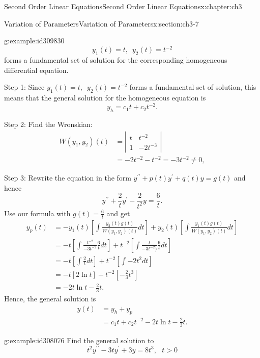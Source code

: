 \documentclass[oneside,10pt,]{book}
\numberwithin{equation}{section}
\numberwithin{equation}{section}
\newcommand{\amp}{&}
\begin{document}
\begin{chapterptx}{Second Order Linear Equations}{}{Second Order Linear Equations}{}{}{x:chapter:ch3}
\begin{sectionptx}{Variation of Parameters}{}{Variation of Parameters}{}{}{x:section:ch3-7}
\begin{example}{}{g:example:id309830}
\begin{equation*}
y_{1}(t)=t,\,\,\,y_{2}(t)=t^{-2}
\end{equation*}
forms a fundamental set of solution for the corresponding homogeneous differential equation.%
\par
Step 1: Since \(y_{1}(t)=t,\,\,\,y_{2}(t)=t^{-2}\) forms a fundamental set of solution, this means that the general solution for the homogeneous equation is%
\begin{equation*}
y_{h}=c_{1}t+c_{2}t^{-2}.
\end{equation*}
%
\par
Step 2: Find the Wronskian:%
\begin{align*}
W(y_{1},y_{2})(t) \amp =\left|\begin{array}{cc}
t \amp t^{-2}\\
1 \amp -2t^{-3}
\end{array}\right|\\
\amp =-2t^{-2}-t^{-2}=-3t^{-2}\neq0,
\end{align*}
%
\par
Step 3: Rewrite the equation in the form \(y^{\prime\prime}+p(t)y^{\prime}+q(t)y=g(t)\) and hence%
\begin{equation*}
y^{\prime\prime}+\frac{2}{t}y^{\prime}-\frac{2}{t^{2}}y=\frac{6}{t}.
\end{equation*}
Use our formula with \(g(t)=\frac{6}{t}\) and get%
\begin{align*}
y_{p}(t) \amp =-y_{1}(t)\left[\int\frac{y_{2}(t)g(t)}{W\left(y_{1},y_{2}\right)(t)}dt\right]+y_{2}(t)\left[\int\frac{y_{1}(t)g(t)}{W\left(y_{1},y_{2}\right)(t)}dt\right]\\
\amp =-t\left[\int\frac{t^{-2}}{-3t^{-2}}\frac{6}{t}dt\right]+t^{-2}\left[\int\frac{t}{-3t^{-2})}\frac{6}{t}dt\right]\\
\amp =-t\left[\int\frac{2}{t}dt\right]+t^{-2}\left[\int-2t^{2}dt\right]\\
\amp =-t\left[2\ln t\right]+t^{-2}\left[-\frac{2}{3}t^{3}\right]\\
\amp =-2t\ln t-\frac{2}{3}t.
\end{align*}
Hence, the general solution is%
\begin{align*}
y(t) \amp =y_{h}+y_{p}\\
\amp =c_{1}t+c_{2}t^{-2}-2t\ln t-\frac{2}{3}t.
\end{align*}
%
\end{example}
\begin{example}{}{g:example:id308076}%
Find the general solution to%
\begin{equation*}
t^{2}y^{\prime\prime}-3ty^{\prime}+3y=8t^{3},\,\,\,\,t>0

\end{equation*}
\end{example}
\end{sectionptx}
\end{chapterptx}
\end{document}
